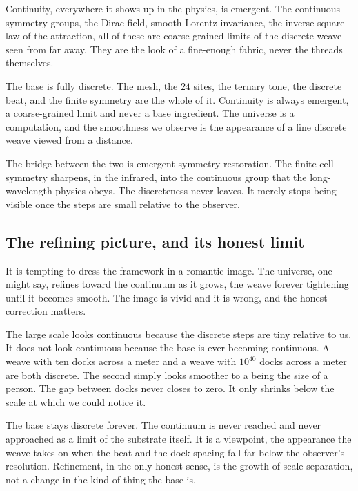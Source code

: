Continuity, everywhere it shows up in the physics, is emergent. The continuous symmetry groups, the Dirac field, smooth Lorentz invariance, the inverse-square law of the attraction, all of these are coarse-grained limits of the discrete weave seen from far away. They are the look of a fine-enough fabric, never the threads themselves.

\begin{principle}
The base is fully discrete. The mesh, the $24$ sites, the ternary tone, the discrete beat, and the finite symmetry are the whole of it. Continuity is always emergent, a coarse-grained limit and never a base ingredient. The universe is a computation, and the smoothness we observe is the appearance of a fine discrete weave viewed from a distance.
\end{principle}

The bridge between the two is emergent symmetry restoration. The finite cell symmetry sharpens, in the infrared, into the continuous group that the long-wavelength physics obeys. The discreteness never leaves. It merely stops being visible once the steps are small relative to the observer.

\subsection{The refining picture, and its honest limit}

It is tempting to dress the framework in a romantic image. The universe, one might say, refines toward the continuum as it grows, the weave forever tightening until it becomes smooth. The image is vivid and it is wrong, and the honest correction matters.

The large scale looks continuous because the discrete steps are tiny relative to us. It does not look continuous because the base is ever becoming continuous. A weave with ten docks across a meter and a weave with $10^{40}$ docks across a meter are both discrete. The second simply looks smoother to a being the size of a person. The gap between docks never closes to zero. It only shrinks below the scale at which we could notice it.

\begin{result}
The base stays discrete forever. The continuum is never reached and never approached as a limit of the substrate itself. It is a viewpoint, the appearance the weave takes on when the beat and the dock spacing fall far below the observer's resolution. Refinement, in the only honest sense, is the growth of scale separation, not a change in the kind of thing the base is.
\end{result}

